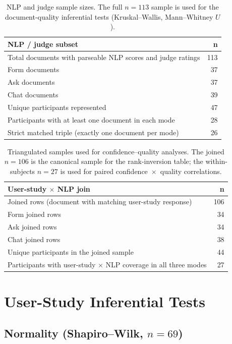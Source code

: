 \begin{table}[htbp]
\centering
\small
\begin{tabular}{lr}
\toprule
\textbf{NLP / judge subset} & \textbf{n} \\
\midrule
Total documents with parseable NLP scores and judge ratings & 113 \\
Form documents & 37 \\
Ask documents & 37 \\
Chat documents & 39 \\
Unique participants represented & 47 \\
Participants with at least one document in each mode & 28 \\
Strict matched triple (exactly one document per mode) & 26 \\
\bottomrule
\end{tabular}
\caption{NLP and judge sample sizes. The full $n = 113$ sample is
used for the document-quality inferential tests (Kruskal--Wallis,
Mann--Whitney $U$).}
\label{tab:n-nlp}
\end{table}

\begin{table}[htbp]
\centering
\small
\begin{tabular}{lr}
\toprule
\textbf{User-study $\times$ NLP join} & \textbf{n} \\
\midrule
Joined rows (document with matching user-study response) & 106 \\
Form joined rows & 34 \\
Ask joined rows & 34 \\
Chat joined rows & 38 \\
Unique participants in the joined sample & 44 \\
Participants with user-study $\times$ NLP coverage in all three modes & 27 \\
\bottomrule
\end{tabular}
\caption{Triangulated samples used for confidence--quality analyses.
The joined $n=106$ is the canonical sample for the rank-inversion
table; the within-subjects $n=27$ is used for paired
confidence~$\times$~quality correlations.}
\label{tab:n-triangulation}
\end{table}

\section{User-Study Inferential Tests}
\label{app:inf-survey}

\subsection{Normality (Shapiro--Wilk, $n = 69$)}

